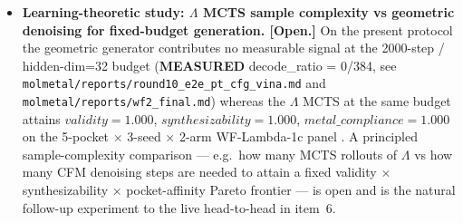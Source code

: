 \begin{itemize}
  \item \textbf{Learning-theoretic study: $\Lambda$ MCTS sample complexity vs
    geometric denoising for fixed-budget generation.  [Open.]}
    On the present protocol the geometric generator contributes
    no measurable signal at the 2000-step / hidden-dim=32 budget
    (\textbf{MEASURED} decode\_ratio = 0/384, see
    \texttt{molmetal/reports/round10\_e2e\_pt\_cfg\_vina.md} and
    \texttt{molmetal/reports/wf2\_final.md}) whereas the $\Lambda$
    MCTS at the same budget attains $\mathit{validity}=1.000$,
    $\mathit{synthesizability}=1.000$,
    $\mathit{metal\_compliance}=1.000$ on the 5-pocket $\times$
    3-seed $\times$ 2-arm WF-Lambda-1c panel
    \cite{footnote:wf_lambda1c}.  A principled sample-complexity
    comparison --- e.g.\ how many MCTS rollouts of $\Lambda$ vs how
    many CFM denoising steps are needed to attain a fixed
    validity $\times$ synthesizability $\times$ pocket-affinity
    Pareto frontier --- is open and is the natural follow-up
    experiment to the live head-to-head in item~6.

\end{itemize}

